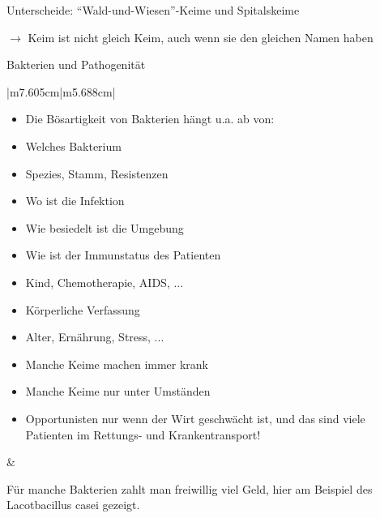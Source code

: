 \documentclass{article}
\begin{document}
Unterscheide:
{\textquotedblleft}Wald-und-Wiesen{\textquotedblright}-Keime und
Spitalskeime 

${\rightarrow}$ Keim ist nicht gleich Keim, auch wenn sie den gleichen
Namen haben

Bakterien und Pathogenit\"at

\begin{flushleft}
\tablehead{}\begin{supertabular}{|m{7.605cm}|m{5.688cm}|}
\hline
\begin{itemize}
\item Die B\"osartigkeit von Bakterien h\"angt u.a. ab von:

\end{itemize}
\begin{itemize}
\item Welches Bakterium

\item Spezies, Stamm, Resistenzen

\item Wo ist die Infektion

\item Wie besiedelt ist die Umgebung

\item Wie ist der Immunstatus des Patienten

\item Kind, Chemotherapie, AIDS, ...

\item K\"orperliche Verfassung

\item Alter, Ern\"ahrung, Stress, ...

\end{itemize}
\begin{itemize}
\item Manche Keime machen immer krank

\item Manche Keime nur unter Umst\"anden

\item Opportunisten nur wenn der Wirt geschw\"acht ist, und das sind
viele Patienten im Rettungs- und Krankentransport!

\end{itemize}
 &
 \par

\centering F\"ur manche Bakterien zahlt man freiwillig viel Geld, hier
am Beispiel des Lacotbacillus casei gezeigt. \par

\\\hline
\end{supertabular}
\end{flushleft}
\end{document}
